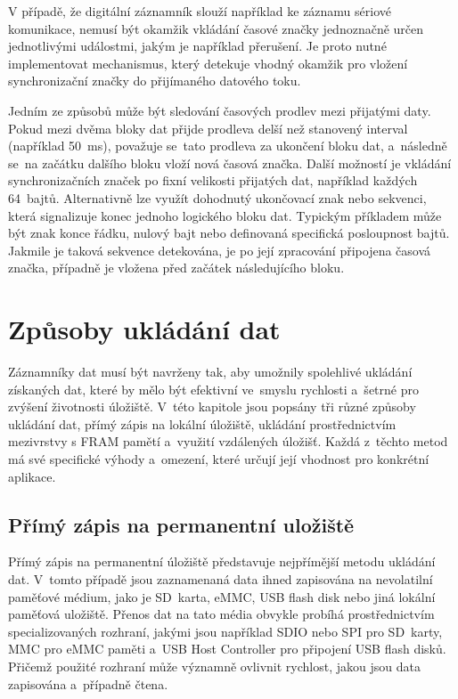 V případě, že digitální záznamník slouží například ke záznamu sériové komunikace, nemusí být okamžik vkládání časové značky jednoznačně určen jednotlivými událostmi, jakým je například přerušení. Je proto nutné implementovat mechanismus, který detekuje vhodný okamžik pro vložení synchronizační značky do přijímaného datového toku.\cite{serial_datalogger_timestamping}

Jedním ze způsobů může být sledování časových prodlev mezi přijatými daty. Pokud mezi dvěma bloky dat přijde prodleva delší než stanovený interval (například 50~ms), považuje se~tato prodleva za ukončení bloku dat, a~následně se~na začátku dalšího bloku vloží nová časová značka. Další možností je vkládání synchronizačních značek po fixní velikosti přijatých dat, například každých 64~bajtů. Alternativně lze využít dohodnutý ukončovací znak nebo sekvenci, která signalizuje konec jednoho logického bloku dat. Typickým příkladem může být znak konce řádku, nulový bajt nebo definovaná specifická posloupnost bajtů. Jakmile je taková sekvence detekována, je po její zpracování připojena časová značka, případně je vložena před začátek následujícího bloku.~\cite{serial_datalogger_timestamping, github_serial_datalogger_w_timestamps_sd_card_fatfs}

\newpage

\section{Způsoby ukládání dat}
Záznamníky dat musí být navrženy tak, aby umožnily spolehlivé ukládání získaných dat, které by mělo být efektivní ve~smyslu rychlosti a~šetrné pro zvýšení životnosti úložiště. V~této kapitole jsou popsány tři různé způsoby ukládání dat, přímý zápis na lokální úložiště, ukládání prostřednictvím mezivrstvy s FRAM pamětí a~využití vzdálených úložišť. Každá z~těchto metod má své specifické výhody a~omezení, které určují její vhodnost pro konkrétní aplikace.

\subsection{Přímý zápis na permanentní uložiště}
Přímý zápis na permanentní úložiště představuje nejpřímější metodu ukládání dat. V~tomto případě jsou zaznamenaná data ihned zapisována na nevolatilní paměťové médium, jako je SD~karta, eMMC, USB flash disk nebo jiná lokální paměťová uložiště. Přenos dat na tato média obvykle probíhá prostřednictvím specializovaných rozhraní, jakými jsou například SDIO nebo SPI pro SD~karty, MMC pro eMMC paměti a~USB Host Controller pro připojení USB flash disků. Přičemž použité rozhraní může významně ovlivnit rychlost, jakou jsou data zapisována a~případně čtena.~\cite{datalogger_sd_mmc_usb_flash_disk}

